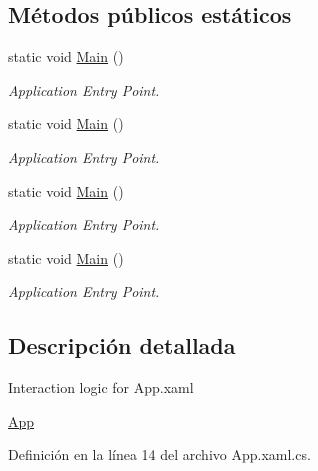 \subsection*{Métodos públicos estáticos}
\begin{DoxyCompactItemize}
\item 
static void \hyperlink{class_proyecto___integrador__3_1_1_app_afebad809311bb8c6e3bccd830f132758}{Main} ()
\begin{DoxyCompactList}\small\item\em Application Entry Point. \end{DoxyCompactList}\item 
static void \hyperlink{class_proyecto___integrador__3_1_1_app_afebad809311bb8c6e3bccd830f132758}{Main} ()
\begin{DoxyCompactList}\small\item\em Application Entry Point. \end{DoxyCompactList}\item 
static void \hyperlink{class_proyecto___integrador__3_1_1_app_afebad809311bb8c6e3bccd830f132758}{Main} ()
\begin{DoxyCompactList}\small\item\em Application Entry Point. \end{DoxyCompactList}\item 
static void \hyperlink{class_proyecto___integrador__3_1_1_app_afebad809311bb8c6e3bccd830f132758}{Main} ()
\begin{DoxyCompactList}\small\item\em Application Entry Point. \end{DoxyCompactList}\end{DoxyCompactItemize}


\subsection{Descripción detallada}
Interaction logic for App.\-xaml 

\hyperlink{class_proyecto___integrador__3_1_1_app}{App} 

Definición en la línea 14 del archivo App.\-xaml.\-cs.



